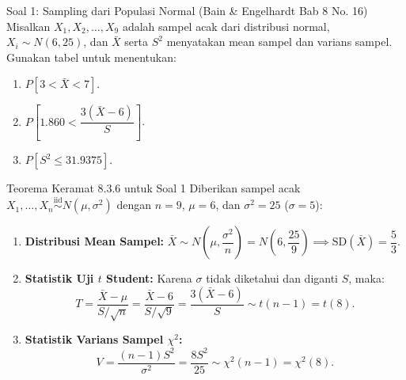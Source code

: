 \documentclass[10pt,twoside]{article}
\begin{document}
\begin{soalbox}{Soal 1: Sampling dari Populasi Normal (Bain \& Engelhardt Bab 8 No. 16)}
Misalkan $X_1, X_2, \dots, X_9$ adalah sampel acak dari distribusi normal, $X_i \sim N(6, 25)$, dan $\bar{X}$ serta $S^2$ menyatakan mean sampel dan varians sampel. Gunakan tabel untuk menentukan:
\begin{enumerate}[label=(\alph*)]
    \item $P[3 < \bar{X} < 7]$.
    \item $P\left[1.860 < \dfrac{3(\bar{X} - 6)}{S}\right]$.
    \item $P[S^2 \le 31.9375]$.
\end{enumerate}
\end{soalbox}

\begin{tipbox}{Teorema Keramat 8.3.6 untuk Soal 1}
Diberikan sampel acak $X_1, \dots, X_n \stackrel{\text{iid}}{\sim} N(\mu, \sigma^2)$ dengan $n=9$, $\mu=6$, dan $\sigma^2=25$ ($\sigma = 5$):
\begin{enumerate}
  \item \textbf{Distribusi Mean Sampel:} $\bar{X} \sim N\left(\mu, \dfrac{\sigma^2}{n}\right) = N\left(6, \dfrac{25}{9}\right) \implies \text{SD}(\bar{X}) = \dfrac{5}{3}$.
  \item \textbf{Statistik Uji $t$ Student:} Karena $\sigma$ tidak diketahui dan diganti $S$, maka:
    \[
    T = \frac{\bar{X} - \mu}{S/\sqrt{n}} = \frac{\bar{X} - 6}{S/\sqrt{9}} = \frac{3(\bar{X} - 6)}{S} \sim t(n-1) = t(8).
    \]
  \item \textbf{Statistik Varians Sampel $\chi^2$:}
    \[
    V = \frac{(n-1)S^2}{\sigma^2} = \frac{8 S^2}{25} \sim \chi^2(n-1) = \chi^2(8).
    \]
\end{enumerate}
\end{tipbox}
\end{document}
